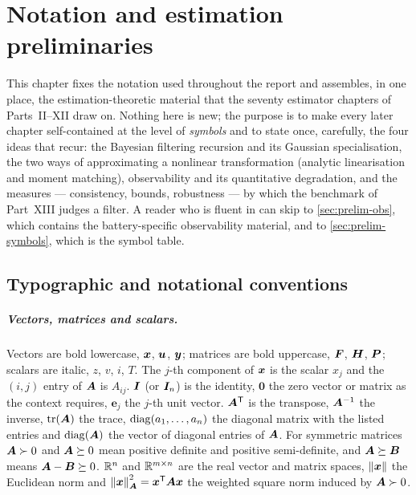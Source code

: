 \chapter{Notation and estimation preliminaries}
\label{ch:prelim}

This chapter fixes the notation used throughout the report and assembles, in one place, the
estimation-theoretic material that the seventy estimator chapters of
Parts~II--XII draw on. Nothing here is new; the purpose is to make every later chapter
self-contained at the level of \emph{symbols} and to state once, carefully, the four ideas that
recur: the Bayesian filtering recursion and its Gaussian specialisation, the two ways of
approximating a nonlinear transformation (analytic linearisation and moment matching),
observability and its quantitative degradation, and the measures --- consistency, bounds,
robustness --- by which the benchmark of Part~XIII judges a filter. A reader who is fluent in
\cite{jazwinski1970,andersonmoore1979,barshalom2001,simon2006,sarkka2013} can skip to
\cref{sec:prelim-obs}, which contains the battery-specific observability material, and to
\cref{sec:prelim-symbols}, which is the symbol table.

\section{Typographic and notational conventions}
\label{sec:prelim-notation}

\paragraph{Vectors, matrices and scalars.} Vectors are bold lowercase, $\bm{x}$, $\bm{u}$, $\bm{y}$;
matrices are bold uppercase, $\bm{F}$, $\bm{H}$, $\bm{P}$; scalars are italic, $z$, $v$, $i$, $T$.
The $j$-th component of $\bm{x}$ is the scalar $x_j$ and the $(i,j)$ entry of $\bm{A}$ is $A_{ij}$.
$\bm{I}$ (or $\bm{I}_n$) is the identity, $\bm{0}$ the zero vector or matrix as the context requires,
$\bm{e}_j$ the $j$-th unit vector. $\bm{A}^{\mathsf{T}}$ is the transpose, $\bm{A}^{-1}$ the inverse,
$\operatorname{tr}(\bm{A})$ the trace, $\operatorname{diag}(a_1,\dots,a_n)$ the diagonal matrix with the listed entries and
$\operatorname{diag}(\bm{A})$ the vector of diagonal entries of $\bm{A}$. For symmetric matrices $\bm{A}\succ 0$ and
$\bm{A}\succeq 0$ mean positive definite and positive semi-definite, and $\bm{A} \succeq \bm{B}$ means
$\bm{A}-\bm{B}\succeq 0$. $\mathbb{R}^{n}$ and $\mathbb{R}^{m\times n}$ are the real vector and matrix spaces,
$\left\lVert \bm{x} \right\rVert$ the Euclidean norm and $\left\lVert \bm{x} \right\rVert_{\bm{A}}^2 = \bm{x}^{\mathsf{T}}\bm{A}\bm{x}$ the weighted square
norm induced by $\bm{A}\succ 0$.

